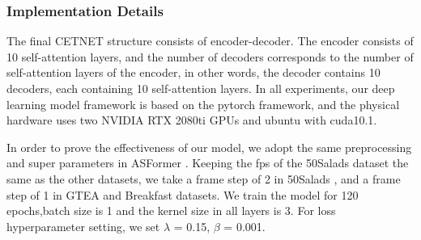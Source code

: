 \documentclass[runningheads]{llncs}
\begin{document}
\subsubsection{Implementation Details}
\par{
	The final CETNET structure consists of encoder-decoder. The encoder consists of 10 self-attention layers, and the number of decoders corresponds to the number of self-attention layers of the encoder, in other words, the decoder contains 10 decoders, each containing 10 self-attention layers. In all experiments, our deep learning model framework is based on the pytorch framework, and the physical hardware uses two NVIDIA RTX 2080ti GPUs and ubuntu with cuda10.1.	
}
\par{
	In order to prove the effectiveness of our model, we adopt the same preprocessing and super parameters in ASFormer \cite{yi2021asformer}. Keeping the fps of the 50Salads dataset the same as the other datasets, we take a frame step of 2 in 50Salads , and a frame step of 1 in GTEA and Breakfast datasets. We train the model for 120 epochs,batch size is 1 and the kernel size in all layers is 3. For loss hyperparameter setting, we set $\lambda $ = 0.15, $\beta $ = 0.001.
}
\end{document}
